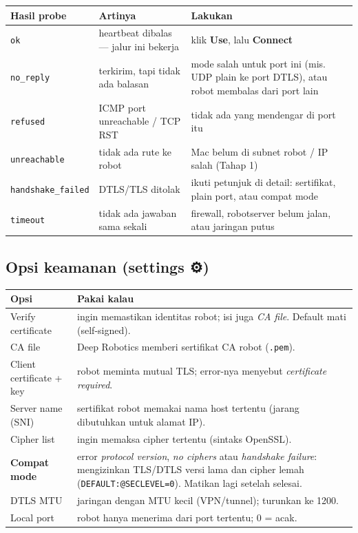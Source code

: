 \documentclass[11pt,a4paper]{article}
\newcommand{\code}[1]{\texttt{#1}}
\newcommand{\gear}{{\symfont ⚙}}
\newcommand{\ui}[1]{\textbf{#1}}
\begin{document}
\begin{xltabular}{\linewidth}{@{}L{30mm}YY@{}}
\toprule
\textbf{Hasil probe} & \textbf{Artinya} & \textbf{Lakukan}\\\midrule
\endhead
\code{ok} & heartbeat dibalas --- jalur ini bekerja & klik \ui{Use}, lalu \ui{Connect}\\
\code{no\_reply} & terkirim, tapi tidak ada balasan & mode salah untuk port ini (mis. UDP plain ke port DTLS), atau robot membalas dari port lain\\
\code{refused} & ICMP port unreachable / TCP RST & tidak ada yang mendengar di port itu\\
\code{unreachable} & tidak ada rute ke robot & Mac belum di subnet robot / IP salah (Tahap 1)\\
\code{handshake\_failed} & DTLS/TLS ditolak & ikuti petunjuk di detail: sertifikat, plain port, atau compat mode\\
\code{timeout} & tidak ada jawaban sama sekali & firewall, robotserver belum jalan, atau jaringan putus\\
\bottomrule
\end{xltabular}

\subsection{Opsi keamanan (settings \gear)}
\begin{xltabular}{\linewidth}{@{}L{42mm}Y@{}}
\toprule
\textbf{Opsi} & \textbf{Pakai kalau}\\\midrule
\endhead
Verify certificate & ingin memastikan identitas robot; isi juga \emph{CA file}. Default mati (self-signed).\\
CA file & Deep Robotics memberi sertifikat CA robot (\code{.pem}).\\
Client certificate + key & robot meminta mutual TLS; error-nya menyebut \emph{certificate required}.\\
Server name (SNI) & sertifikat robot memakai nama host tertentu (jarang dibutuhkan untuk alamat IP).\\
Cipher list & ingin memaksa cipher tertentu (sintaks OpenSSL).\\
\textbf{Compat mode} & error \emph{protocol version}, \emph{no ciphers} atau \emph{handshake failure}: mengizinkan TLS/DTLS versi lama dan cipher lemah (\code{DEFAULT:@SECLEVEL=0}). Matikan lagi setelah selesai.\\
DTLS MTU & jaringan dengan MTU kecil (VPN/tunnel); turunkan ke 1200.\\
Local port & robot hanya menerima dari port tertentu; 0 = acak.\\
\bottomrule
\end{xltabular}
\end{document}
